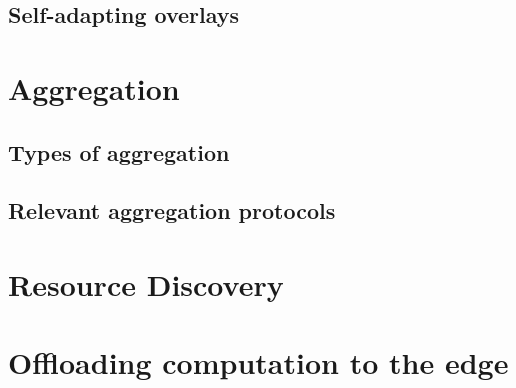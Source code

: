 \subsection{Self-adapting overlays}

\section{Aggregation} %
\label{sec:aggregation}

\subsection{Types of aggregation}
\subsection{Relevant aggregation protocols}

\section{Resource Discovery} %
\label{sec:res_discvovery}

\section{Offloading computation to the edge} %
\label{sec:offloading_comp}